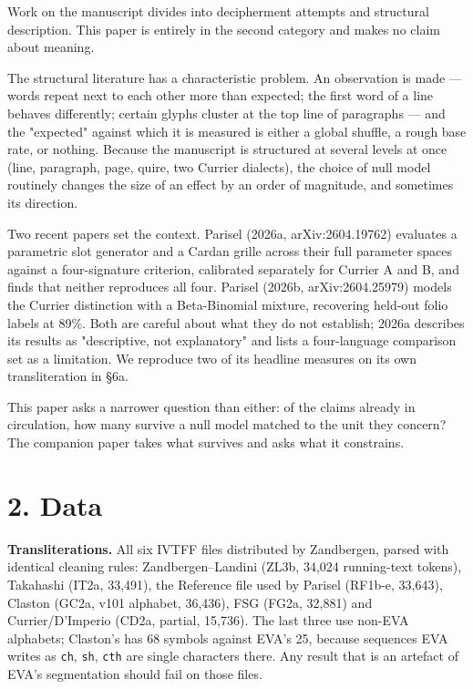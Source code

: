 \documentclass[11pt,a4paper]{article}
\begin{document}
Work on the manuscript divides into decipherment attempts and structural description. This paper is entirely in the second category and makes no claim about meaning.


The structural literature has a characteristic problem. An observation is made --- words repeat next to each other more than expected; the first word of a line behaves differently; certain glyphs cluster at the top line of paragraphs --- and the "expected" against which it is measured is either a global shuffle, a rough base rate, or nothing. Because the manuscript is structured at several levels at once (line, paragraph, page, quire, two Currier dialects), the choice of null model routinely changes the size of an effect by an order of magnitude, and sometimes its direction.


Two recent papers set the context. Parisel (2026a, arXiv:2604.19762) evaluates a parametric slot generator and a Cardan grille across their full parameter spaces against a four-signature criterion, calibrated separately for Currier A and B, and finds that neither reproduces all four. Parisel (2026b, arXiv:2604.25979) models the Currier distinction with a Beta-Binomial mixture, recovering held-out folio labels at 89\%. Both are careful about what they do not establish; 2026a describes its results as "descriptive, not explanatory" and lists a four-language comparison set as a limitation. We reproduce two of its headline measures on its own transliteration in \S6a.


This paper asks a narrower question than either: of the claims already in circulation, how many survive a null model matched to the unit they concern? The companion paper takes what survives and asks what it constrains.

\section*{2. Data}


\textbf{Transliterations.} All six IVTFF files distributed by Zandbergen, parsed with identical cleaning rules: Zandbergen--Landini (ZL3b, 34,024 running-text tokens), Takahashi (IT2a, 33,491), the Reference file used by Parisel (RF1b-e, 33,643), Claston (GC2a, v101 alphabet, 36,436), FSG (FG2a, 32,881) and Currier/D'Imperio (CD2a, partial, 15,736). The last three use non-EVA alphabets; Claston's has 68 symbols against EVA's 25, because sequences EVA writes as \texttt{ch}, \texttt{sh}, \texttt{cth} are single characters there. Any result that is an artefact of EVA's segmentation should fail on those files.
\end{document}
